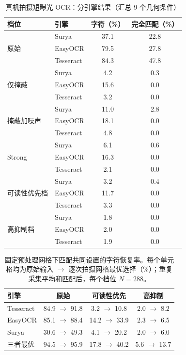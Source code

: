 \documentclass{ieeeaccess}
\begin{document}
\begin{table}[!t]
\caption{真机拍摄短曝光 OCR：分引擎结果（汇总 9 个几何条件）}
\label{tab:real_ocr_engine}
\centering
\footnotesize
\setlength{\tabcolsep}{5.5pt}
\begin{tabular}{llcc}
\toprule
档位 & 引擎 & 字符（\%） & 完全匹配（\%） \\
\midrule
\multirow{3}{*}{原始}
 & Surya & 37.1 & 22.8 \\
 & EasyOCR & 79.5 & 27.8 \\
 & Tesseract & 84.3 & 47.8 \\
\midrule
\multirow{3}{*}{仅掩蔽}
 & Surya & 4.2 & 0.3 \\
 & EasyOCR & 15.6 & 0.0 \\
 & Tesseract & 3.2 & 0.0 \\
\midrule
\multirow{3}{*}{掩蔽加噪声}
 & Surya & 11.0 & 2.8 \\
 & EasyOCR & 18.1 & 0.0 \\
 & Tesseract & 4.8 & 0.0 \\
\midrule
\multirow{3}{*}{Strong}
 & Surya & 6.1 & 0.6 \\
 & EasyOCR & 16.3 & 0.0 \\
 & Tesseract & 2.1 & 0.0 \\
\midrule
\multirow{3}{*}{可读性优先档}
 & Surya & 3.2 & 0.4 \\
 & EasyOCR & 11.7 & 0.0 \\
 & Tesseract & 3.3 & 0.0 \\
\midrule
\multirow{3}{*}{高抑制档}
 & Surya & 1.8 & 0.0 \\
 & EasyOCR & 2.0 & 0.0 \\
 & Tesseract & 1.9 & 0.0 \\
\bottomrule
\end{tabular}
\end{table}

\begin{table}[!t]
\caption{固定预处理网格下匹配共同设置的字符恢复率。每个单元格均为原始输入 $\rightarrow$ 逐次拍摄网格最优选择（\%）；重复采集平均和匹配后，每个档位 $N=288$。}
\label{tab:preprocessing_grid}
\centering
\footnotesize
\setlength{\tabcolsep}{4.2pt}
\begin{tabular}{lccc}
\toprule
引擎 & 原始 & 可读性优先 & 高抑制 \\
\midrule
Tesseract & 84.9 $\rightarrow$ 91.8 & 3.2 $\rightarrow$ 10.8 & 2.0 $\rightarrow$ 8.2 \\
EasyOCR & 85.1 $\rightarrow$ 88.4 & 14.2 $\rightarrow$ 33.9 & 2.3 $\rightarrow$ 6.5 \\
Surya & 30.6 $\rightarrow$ 49.3 & 4.1 $\rightarrow$ 20.2 & 2.0 $\rightarrow$ 6.0 \\
三者最优 & 94.5 $\rightarrow$ 95.9 & 17.8 $\rightarrow$ 40.2 & 5.6 $\rightarrow$ 13.7 \\
\bottomrule
\end{tabular}
\end{table}
\end{document}
